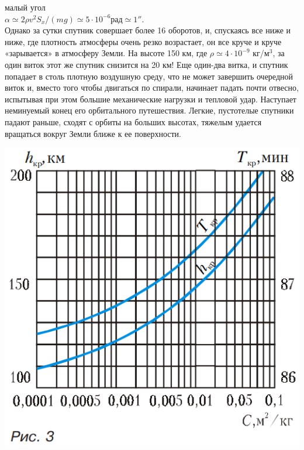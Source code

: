 
\begin{multicols}{3} \small
малый угол
\\

$\alpha \simeq 2\rho\textit{v}^2S_x\slash(mg) \simeq 5\cdot10^{-6}рад \simeq 1''$.
\\

Однако за сутки спутник совершает более 16 оборотов, и, спускаясь все ниже и ниже, где плотность атмосферы очень резко возрастает, он все круче и круче «зарывается» в атмосферу Земли. На высоте 150 км, где $\rho\simeq 4\cdot10^{-9}$ кг/м$^3$, за один виток этот же спутник снизится на 20 км! Еще один-два витка, и спутник попадает в столь плотную воздушную среду, что не может завершить очередной виток и, вместо того чтобы двигаться по спирали, начинает падать почти отвесно, испытывая при этом большие механические нагрузки и тепловой удар. Наступает неминуемый конец его орбитального путешествия. Легкие, пустотелые спутники падают раньше, сходят с орбиты на больших высотах, тяжелым удается вращаться вокруг Земли ближе к ее поверхности.

\begin{Figure}
\centering
\includegraphics[width=\textwidth]{pic.jpg}
\end{Figure}


\end{multicols}
